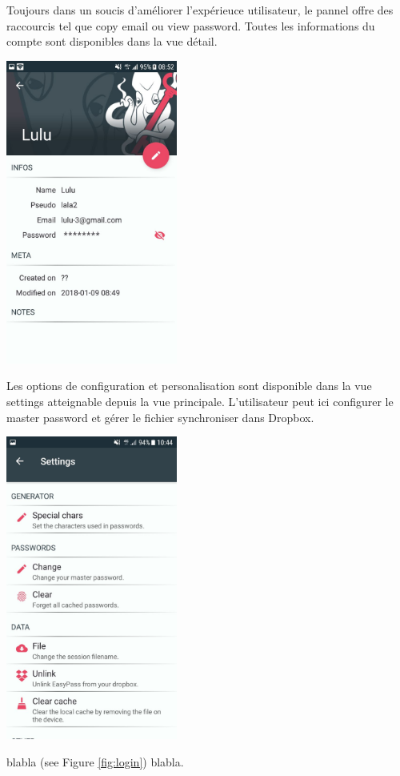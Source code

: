 Toujours dans un soucis d'améliorer l'expérieuce utilisateur, le pannel offre des raccourcis tel que copy email ou view password. Toutes les informations du compte sont disponibles dans la vue détail.

\includegraphics[height=10cm]{details.jpg}

Les options de configuration et personalisation sont disponible dans la vue settings atteignable depuis la vue principale. L'utilisateur peut ici configurer le master password et gérer le fichier synchroniser dans Dropbox.

\includegraphics[height=10cm]{settings.jpg}

\begin{center}
    \begin{minipage}{.3\textwidth}
    \end{minipage}
    \begin{minipage}{.3\textwidth}
    \end{minipage}
    \begin{minipage}{.3\textwidth}
    \end{minipage}        
\end{center}

blabla (see Figure \ref{fig:login}) blabla.

